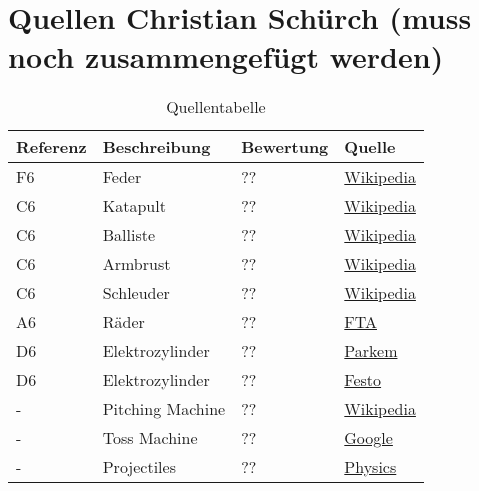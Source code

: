 \section{Quellen Christian Schürch (muss noch zusammengefügt werden)}

\begin{table}[h!]
	\centering
	\begin{tabular}{l l l l}
		Referenz & Beschreibung & Bewertung & Quelle \\
		\hline
        
        F6 & Feder & ?? & \href{http://de.wikipedia.org/wiki/Feder_(Technik)}{Wikipedia} \\
        
	    C6 & Katapult & ?? & \href{http://de.wikipedia.org/wiki/Katapult}{Wikipedia} \\
	    
	    C6 & Balliste & ?? & \href{http://de.wikipedia.org/wiki/Balliste}{Wikipedia} \\
	    
	    C6 & Armbrust & ?? & \href{http://de.wikipedia.org/wiki/Armbrust}{Wikipedia} \\
	    
	    C6 & Schleuder & ?? & \href{http://de.wikipedia.org/wiki/Zwille}{Wikipedia} \\
        
        A6 & Räder & ?? & \href{http://www.fta.ch/de/r/raeder-2000.html}{FTA} \\
        
        D6 & Elektrozylinder & ?? & \href{http://www.parkem.ch/medien/produkte/bewegungsmechanik/pdf/mechanik_et_tech_de_190-550011.pdf}{Parkem} \\
        
        D6 & Elektrozylinder & ?? & \href{http://www.festo.com/net/de_de/SupportPortal/Details/219992/PressArticle.aspx}{Festo} \\
        
        - & Pitching Machine & ?? & \href{http://en.wikipedia.org/wiki/Pitching_machine}{Wikipedia} \\
        
        - & Toss Machine & ?? & \href{https://www.google.ch/search?q=toss+machine&ie=utf-8&oe=utf-8&aq=t&rls=org.mozilla:de:official&client=firefox-a&channel=sb&gfe_rd=cr&ei=zk4uVPT4Mseh7AbexYGAAg}{Google} \\
        
        - & Projectiles & ?? & \href{http://physics.info/projectiles/}{Physics} \\
        
	\end{tabular}
	\caption{Quellentabelle}
	\label{tab:quelle}
\end{table}
